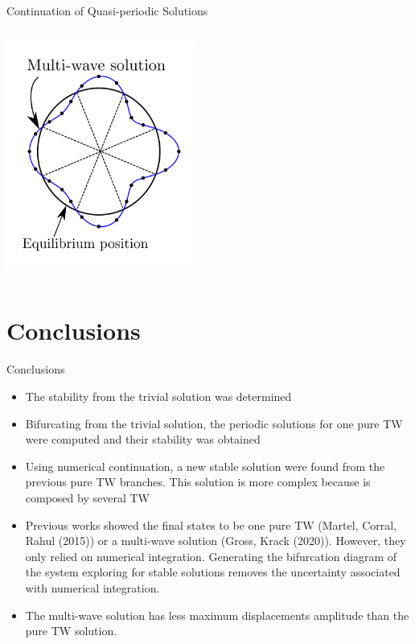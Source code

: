 \documentclass[dvipsnames, aspectratio = 169]{beamer}
\begin{document}
\begin{frame}{Continuation of Quasi-periodic Solutions}
	\begin{columns}
		\begin{column}{0.5\textwidth}
			\includegraphics[width=6.2cm,keepaspectratio]{mode_shapesMW.png}
		\end{column}
	\end{columns}
\end{frame}

\section{Conclusions}

\begin{frame}{Conclusions}
	\begin{itemize}
		\item The stability from the trivial solution was determined
		\item Bifurcating from the trivial solution, the periodic solutions for one pure TW were computed and their stability was obtained
		\item Using numerical continuation, a new stable solution were found from the previous pure TW branches. This solution is more complex because is composed by several TW
		\item Previous works showed the final states to be one pure TW (Martel, Corral, Rahul (2015)) or a multi-wave solution (Gross, Krack (2020)). However, they only relied on numerical integration. Generating the bifurcation diagram of the system exploring for stable solutions removes the uncertainty associated with numerical integration.
		\item The multi-wave solution has less maximum displacements amplitude than the pure TW solution.
	\end{itemize}
\end{frame}
\end{document}
